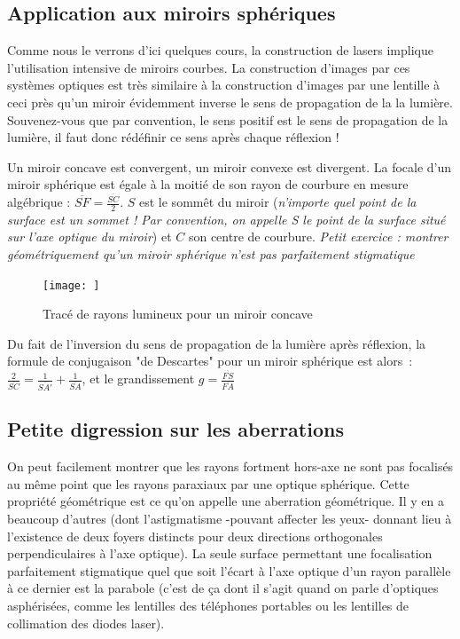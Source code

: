 \documentclass[a4paper]{book}
\begin{document}
\subsection{Application aux miroirs sphériques}

Comme nous le verrons d'ici quelques cours, la construction de lasers implique l'utilisation intensive de miroirs courbes. La construction d'images par ces systèmes optiques est très similaire à la construction d'images par une lentille à ceci près qu'un miroir évidemment inverse le sens de propagation de la la lumière. Souvenez-vous que par convention, le sens positif est le sens de propagation de la lumière, il faut donc rédéfinir ce sens après chaque réflexion ! 

Un miroir concave est convergent, un miroir convexe est divergent. La focale d'un miroir sphérique est égale à la moitié de son rayon de courbure en mesure algébrique : $\overline{SF}=\frac{\overline{SC}}{2}$. $S$ est le sommêt du miroir (\textit{n'importe quel point de la surface est un sommet ! Par convention, on appelle S le point de la surface situé sur l'axe optique du miroir}) et $C$ son centre de courbure.
\textit{Petit exercice : montrer géométriquement qu'un miroir sphérique n'est pas parfaitement stigmatique}
\begin{figure}[!htbp]
\label{fig:miroir_concave}
\begin{center}
\texttt{[image: ]}
\end{center}
\caption{Tracé de rayons lumineux pour un miroir concave}
\end{figure}

Du fait de l'inversion du sens de propagation de la lumière après réflexion, la formule de conjugaison "de Descartes" pour un miroir sphérique est alors~: $\frac{2}{\overline{SC}}=\frac{1}{\overline{SA'}}+\frac{1}{\overline{SA}}$, et le grandissement $g = \frac{\overline{FS}}{\overline{FA}}$

\subsection{Petite digression sur les aberrations}

On peut facilement montrer que les rayons fortment hors-axe ne sont pas focalisés au même point que les rayons paraxiaux par une optique sphérique. Cette propriété géométrique est ce qu'on appelle une aberration géométrique. Il y en a beaucoup d'autres (dont l'astigmatisme -pouvant affecter les yeux- donnant lieu à l'existence de deux foyers distincts pour deux directions orthogonales perpendiculaires à l'axe optique). La seule surface permettant une focalisation parfaitement stigmatique quel que soit l'écart à l'axe optique d'un rayon parallèle à ce dernier est la parabole (c'est de ça dont il s'agit quand on parle d'optiques asphérisées, comme les lentilles des téléphones portables ou les lentilles de collimation des diodes laser).
\end{document}
